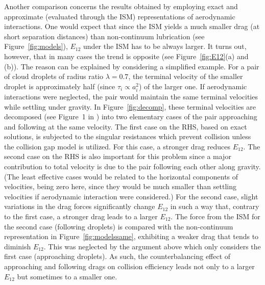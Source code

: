 \documentclass[../thesis.tex]{subfiles}
\begin{document}
Another comparison concerns the results obtained by employing exact and approximate (evaluated through the ISM) representations of aerodynamic interactions. One would expect that since the ISM yields a much smaller drag (at short separation distances) than non-continuum lubrication (see Figure~\ref{fig:models}), $E_{12}$ under the ISM has to be always larger. It turns out, however, that in many cases the trend is opposite (see Figure~\ref{fig:E12}(a) and (b)). The reason can be explained by considering a simplified example. For a pair of cloud droplets of radius ratio $\lambda = 0.7$, the terminal velocity of the smaller droplet is approximately half (since $\tau_i\propto a_i^2$) of the larger one. If aerodynamic interactions were neglected, the pair would maintain the same terminal velocities while settling under gravity. In Figure~\ref{fig:decomp}, these terminal velocities are decomposed (see Figure~1 in \cite{RWMG11}) into two elementary cases of the pair approaching and following at the same velocity. The first case on the RHS, based on exact solutions, is subjected to the singular resistances which prevent collision unless the collision gap model is utilized. For this case, a stronger drag reduces $E_{12}$. The second case on the RHS is also important for this problem since a major contribution to total velocity is due to the pair following each other along gravity. (The least effective cases would be related to the horizontal components of velocities, being zero here, since they would be much smaller than settling velocities if aerodynamic interaction were considered.) For the second case, slight variations in the drag forces significantly change $E_{12}$ in such a way that, contrary to the first case, a stronger drag leads to a larger $E_{12}$. The force from the ISM for the second case (following droplets) is compared with the non-continuum representation in Figure~\ref{fig:modelssame}, exhibiting a weaker drag that tends to diminish $E_{12}$. This was neglected by the argument above which only considers the first case (approaching droplets). As such, the counterbalancing effect of approaching and following drags on collision efficiency leads not only to a larger $E_{12}$ but sometimes to a smaller one.
\end{document}
